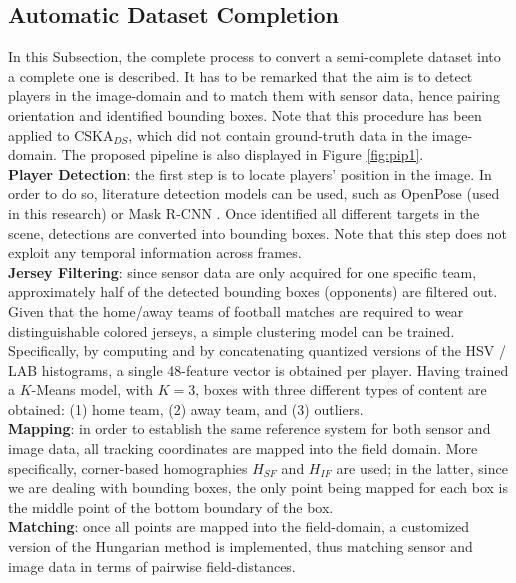 \documentclass{article}
\begin{document}
\subsection{Automatic Dataset Completion} \label{sec:Pip1}
In this Subsection, the complete process to convert a semi-complete dataset into a complete one is described. It has to be remarked that the aim is to detect players in the image-domain and to match them with sensor data, hence pairing orientation and identified bounding boxes. Note that this procedure has been applied to $\text{CSKA}_{DS}$, which did not contain ground-truth data in the image-domain. The proposed pipeline is also displayed in Figure \ref{fig:pip1}. \\
\textbf{Player Detection}: the first step is to locate players' position in the image. In order to do so, literature detection models can be used, such as OpenPose \cite{cao2017realtime} (used in this research) or Mask R-CNN \cite{maskrcnn}. Once identified all different targets in the scene, detections are converted into bounding boxes. Note that this step does not exploit any temporal information across frames.\\ 
\textbf{Jersey Filtering}: since sensor data are only acquired for one specific team, approximately half of the detected bounding boxes (opponents) are filtered out. Given that the home/away teams of football matches are required to wear distinguishable colored jerseys, a simple clustering model can be trained. Specifically, by computing and by concatenating quantized versions of the HSV / LAB histograms, a single 48-feature vector is obtained per player. Having trained a $K$-Means model, with $K=3$, boxes with three different types of content are obtained: (1) home team, (2) away team, and (3) outliers.\\
\textbf{Mapping}: in order to establish the same reference system for both sensor and image data, all tracking coordinates are mapped into the field domain. More specifically, corner-based homographies $H_{SF}$ and $H_{IF}$ are used; in the latter, since we are dealing with bounding boxes, the only point being mapped for each box is the middle point of the bottom boundary of the box.\\
\textbf{Matching}: once all points are mapped into the field-domain, a customized version of the Hungarian method \cite{kuhn1955hungarian} is implemented, thus matching sensor and image data in terms of pairwise field-distances. \\ 
\end{document}

